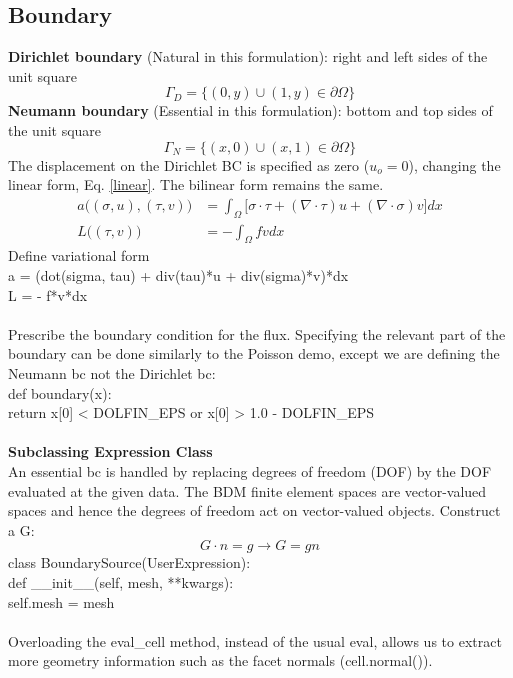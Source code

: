 \documentclass[12pt,3p]{article}
\begin{document}
\subsection{Boundary}
\textbf{Dirichlet boundary} (Natural in this formulation): right and left sides of the unit square
\[ \Gamma_{D} = \{(0,y) \cup (1,y) \in \partial \Omega \} \]
\textbf{Neumann boundary} (Essential in this formulation): bottom and top sides of the unit square
\[ \Gamma_{N} = \{(x,0) \cup (x,1) \in \partial \Omega \} \]
The displacement on the Dirichlet BC is specified as zero ($u_o = 0$), changing the linear form, Eq. \ref{linear}. The bilinear form remains the same. 
\begin{align*}
a\big((\sigma,u),(\tau, v) \big) &= \int_{\Omega} \bigg[ \sigma \cdot \tau  + (\nabla \cdot \tau) u + (\nabla \cdot \sigma) v \bigg] dx \\
L\big((\tau, v) \big) &= - \int_{\Omega} fv dx
\end{align*}
Define variational form \\
{\selectfont
a = (dot(sigma, tau) + div(tau)*u + div(sigma)*v)*dx \\ 
L = - f*v*dx \\ \\
}
Prescribe the boundary condition for the flux. Specifying the relevant part of the boundary can be done similarly to the Poisson demo, except we are defining the Neumann bc not the Dirichlet bc: \\
{\selectfont
def boundary(x): \\
\indent \indent return x[0] < DOLFIN\_EPS or x[0] > 1.0 - DOLFIN\_EPS \\ \\
} 
\textbf{Subclassing Expression Class} \\
An essential bc is handled by replacing degrees of freedom (DOF) by the DOF evaluated at the given data. The BDM finite element spaces are vector-valued spaces and hence the degrees of freedom act on vector-valued objects. Construct a G:
\[G \cdot n = g \rightarrow G = gn\]
{\selectfont
class BoundarySource(UserExpression): \\
\indent def \_\_init\_\_(self, mesh, **kwargs): \\
\indent \indent self.mesh = mesh \\ \\
} 
Overloading the {\selectfont eval\_cell} method, instead of the usual {\selectfont eval}, allows us to extract more geometry information such as the facet normals (cell.normal()). \\ 
\end{document}
